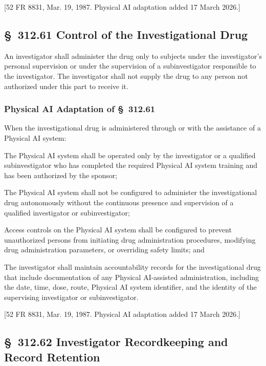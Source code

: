 \documentclass[11pt]{article}
\begin{document}
[52 FR 8831, Mar. 19, 1987. Physical AI adaptation added 17 March 2026.]

\subsection{\S~312.61 Control of the Investigational Drug}

An investigator shall administer the drug only to subjects under the investigator's personal supervision or under the supervision of a subinvestigator responsible to the investigator. The investigator shall not supply the drug to any person not authorized under this part to receive it.

\subsubsection{Physical AI Adaptation of \S~312.61}

When the investigational drug is administered through or with the assistance of a Physical AI system:

\begin{description}[leftmargin=0.8cm,style=sameline]
\item[(a)] The Physical AI system shall be operated only by the investigator or a qualified subinvestigator who has completed the required Physical AI system training and has been authorized by the sponsor;
\item[(b)] The Physical AI system shall not be configured to administer the investigational drug autonomously without the continuous presence and supervision of a qualified investigator or subinvestigator;
\item[(c)] Access controls on the Physical AI system shall be configured to prevent unauthorized persons from initiating drug administration procedures, modifying drug administration parameters, or overriding safety limits; and
\item[(d)] The investigator shall maintain accountability records for the investigational drug that include documentation of any Physical AI-assisted administration, including the date, time, dose, route, Physical AI system identifier, and the identity of the supervising investigator or subinvestigator.
\end{description}

[52 FR 8831, Mar. 19, 1987. Physical AI adaptation added 17 March 2026.]

\subsection{\S~312.62 Investigator Recordkeeping and Record Retention}
\end{document}
